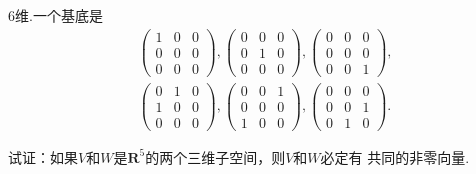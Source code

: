 ﻿\documentclass{book} \usepackage{exsheets} \usepackage{xeCJK}
\begin{document}
\begin{solution}
  $6$维.一个基底是
  \begin{align*}
    &
      \begin{pmatrix}
        1&0&0\\
        0&0&0\\
        0&0&0
      \end{pmatrix},
             \begin{pmatrix}
               0&0&0\\
               0&1&0\\
               0&0&0
             \end{pmatrix},
                    \begin{pmatrix}
                      0&0&0\\
                      0&0&0\\
                      0&0&1
                    \end{pmatrix}, \\&
                                       \begin{pmatrix}
                                         0&1&0\\
                                         1&0&0\\
                                         0&0&0
                                       \end{pmatrix},
                                              \begin{pmatrix}
                                                0&0&1\\
                                                0&0&0\\
                                                1&0&0
                                              \end{pmatrix},
                                                     \begin{pmatrix}
                                                       0&0&0\\
                                                       0&0&1\\
                                                       0&1&0
                                                     \end{pmatrix}.
  \end{align*}
\end{solution}
\begin{question}
  试证：如果$V$和$W$是$\mathbf{R}^5$的两个三维子空间，则$V$和$W$必定有
  共同的非零向量.
\end{question}
\end{document}
